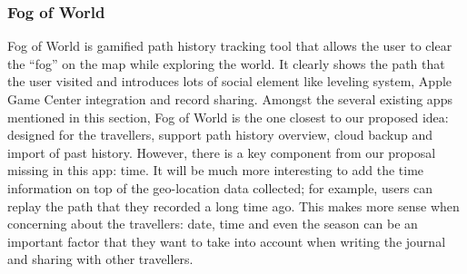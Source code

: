 \documentclass[12pt,a4paper]{article}
\begin{document}
            \subsubsection{Fog of World}
            \label{intro:comparison:fow}
            Fog of World is gamified path history tracking tool that allows the user to clear the ``fog'' on the map while exploring the world. It clearly shows the path that the user visited and introduces lots of social element like leveling system, Apple Game Center integration and record sharing. Amongst the several existing apps mentioned in this section, Fog of World is the one closest to our proposed idea: designed for the travellers, support path history overview, cloud backup and import of past history. However, there is a key component from our proposal missing in this app: time. It will be much more interesting to add the time information on top of the geo-location data collected; for example, users can replay the path that they recorded a long time ago. This makes more sense when concerning about the travellers: date, time and even the season can be an important factor that they want to take into account when writing the journal and sharing with other travellers.
            
\end{document}
